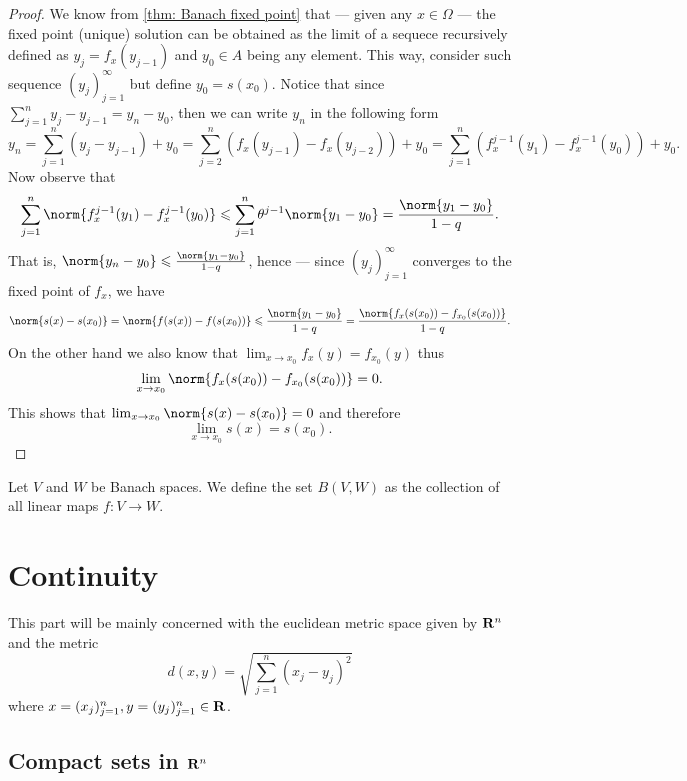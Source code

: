 \begin{proof}
We know from \cref{thm: Banach fixed point} that --- given any \(x \in \Omega\) ---
the fixed point (unique) solution can be obtained as the limit of
a sequece recursively defined as \(y_j = f_x(y_{j-1})\) and \(y_0 \in A\) being
any element. This way, consider such sequence \((y_j)_{j=1}^{\infty}\) but define
\(y_0 = s(x_0)\). Notice that since \(\sum_{j=1}^n y_j - y_{j-1} = y_n - y_0\),
then we can write \(y_n\) in the following form
\[
y_n = \sum_{j=1}^n (y_j - y_{j-1}) + y_0
= \sum_{j=2}^n (f_x(y_{j-1}) - f_x(y_{j-2}))
+ y_0 = \sum_{j=1}^n \left(f_x^{j-1}(y_1) - f_x^{j-1}(y_0)\right) + y_{0}.
\]
Now observe that
\[
\sum_{j=1}^n \norm{f_x^{j-1}(y_1) - f_x^{j-1}(y_0)}
\leq \sum_{j=1}^n \theta^{j-1} \norm{y_1 -
y_0} = \frac{\norm{y_1 - y_0}}{1 - q}.
\]
That is, \(\norm{y_n - y_0} \leq \frac{\norm{y_1 - y_0}}{1 - q}\), hence --- since
\((y_j)_{j=1}^{\infty}\) converges to the fixed point of \(f_x\), we have
\begin{align*}
\norm{s(x) - s(x_0)} = \norm{f(s(x)) - f(s(x_0))}
\leq \frac{\norm{y_1 - y_0}}{1-q}
= \frac{\norm{f_x(s(x_0)) - f_{x_0}(s(x_0))}}{1 - q}.
\end{align*}
On the other hand we also know that \(\lim_{x \to x_0}f_x(y) = f_{x_0}(y)\) thus
\[
\lim_{x \to x_0} \norm{f_x(s(x_0)) - f_{x_0}(s(x_0))} = 0.
\]
This shows that \(\lim_{x \to x_0} \norm{s(x) - s(x_0)} = 0\) and therefore
\[
\lim_{x \to x_0} s(x) = s(x_0).
\]
\end{proof}

\begin{definition}
\label{def:banach-space-hom-set}
Let \(V\) and \(W\) be Banach spaces. We define the set \(B(V, W)\) as the
collection of all linear maps \(f: V \to W\).
\end{definition}

\section{Continuity}

\begin{remark}
This part will be mainly concerned with the euclidean metric space given by
\(\mathbf{R}^n\) and the metric
\[
d(x, y) = \sqrt{\sum_{j=1}^n (x_j - y_j)^2}
\]
where \(x = (x_j)_{j=1}^n, y = (y_j)_{j=1}^n \in \mathbf{R}\).
\end{remark}

\subsection{Compact sets in \texorpdfstring{\(\mathbf{R}^n\)}{Rn}}

